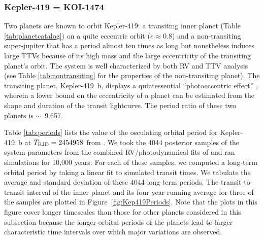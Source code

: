 \documentclass{aastex62}
\begin{document}
\subsubsection{Kepler-419 = KOI-1474}

Two planets are known to orbit Kepler-419: a transiting inner planet (Table \ref{tab:planetcatalog}) on a quite eccentric orbit ($e \approx 0.8$) and a  non-transiting super-jupiter that has a period almost ten times as long but nonetheless induces large TTVs because of its high mass and the large eccentricity of the transiting planet's orbit.  The system is well characterized by both RV and TTV analysis (see Table \ref{tab:nontransiting} for the properties of the non-transiting planet). The transiting planet, Kepler-419~b, displays a quintessential ``photoeccentric effect'' \citep{Dawson:2012}, wherein a lower bound on the eccentricity of a planet can be estimated from the shape and duration of the transit lightcurve. The period ratio of these two planets is $\sim$~9.657. 

Table \ref{tab:periods} lists the value of the osculating orbital period for Kepler-419~b at $T_{\rm BJD} = 2454958$ from \cite{Almenara:2018}.  We took the 4044 posterior samples of the system parameters from the combined RV/photodynamical fits of \cite{Almenara:2018} and ran simulations for 10,000 years. For each of these samples, we computed a long-term orbital period by taking a linear fit to simulated transit times. We tabulate the average and standard deviation of these 4044 long-term periods. The transit-to-transit interval of the inner planet and its four year running average for three of the samples are plotted in Figure~\ref{fig:Kep419Periods}.  Note that the plots in this figure cover longer timescales than those for other planets considered in this subsection because the longer orbital periods of the planets lead to larger characteristic time intervals over which major variations are observed.  

\end{document}
